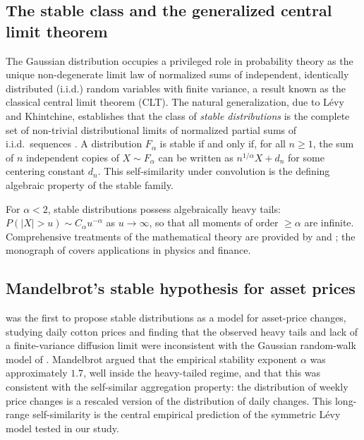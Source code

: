 \documentclass[12pt,a4paper]{article}
\begin{document}
\subsection{The stable class and the generalized central limit theorem}

The Gaussian distribution occupies a privileged role in probability theory as
the unique non-degenerate limit law of normalized sums of independent,
identically distributed (i.i.d.) random variables with finite variance,
a result known as the classical central limit theorem (CLT). The natural generalization, due to
Lévy and Khintchine, establishes that the class of \textit{stable
distributions} is the complete set of non-trivial distributional limits of
normalized partial sums of i.i.d.\ sequences
\parencite{SamorodTaqqu1994,GnedenkoKolmogorov1954}. A distribution
$F_\alpha$ is stable if and only if, for all $n \geq 1$, the sum of $n$
independent copies of $X \sim F_\alpha$ can be written as $n^{1/\alpha} X +
d_n$ for some centering constant $d_n$. This self-similarity under
convolution is the defining algebraic property of the stable family.

For $\alpha < 2$, stable distributions possess algebraically heavy tails:
$P(|X| > u) \sim C_\alpha u^{-\alpha}$ as $u \to \infty$, so that all moments
of order $\geq \alpha$ are infinite. Comprehensive treatments of the
mathematical theory are provided by \textcite{SamorodTaqqu1994} and
\textcite{Zolotarev1986}; the monograph of \textcite{Uchaikin2003} covers
applications in physics and finance.

\subsection{Mandelbrot's stable hypothesis for asset prices}

\textcite{Mandelbrot1963} was the first to propose stable distributions as a
model for asset-price changes, studying daily cotton prices and finding that
the observed heavy tails and lack of a finite-variance diffusion limit were
inconsistent with the Gaussian random-walk model of \textcite{Bachelier1900}.
Mandelbrot argued that the empirical stability exponent $\alpha$ was
approximately $1.7$, well inside the heavy-tailed regime, and that this was
consistent with the self-similar aggregation property: the distribution of
weekly price changes is a rescaled version of the distribution of daily
changes. This long-range self-similarity is the central empirical prediction
of the symmetric Lévy model tested in our study.
\end{document}
